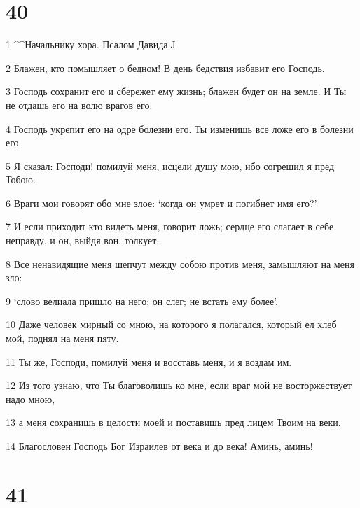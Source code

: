 \chapter{40}

\par 1 ^^Начальнику хора. Псалом Давида.^^
\par 2 Блажен, кто помышляет о бедном! В день бедствия избавит его Господь.
\par 3 Господь сохранит его и сбережет ему жизнь; блажен будет он на земле. И Ты не отдашь его на волю врагов его.
\par 4 Господь укрепит его на одре болезни его. Ты изменишь все ложе его в болезни его.
\par 5 Я сказал: Господи! помилуй меня, исцели душу мою, ибо согрешил я пред Тобою.
\par 6 Враги мои говорят обо мне злое: `когда он умрет и погибнет имя его?'
\par 7 И если приходит кто видеть меня, говорит ложь; сердце его слагает в себе неправду, и он, выйдя вон, толкует.
\par 8 Все ненавидящие меня шепчут между собою против меня, замышляют на меня зло:
\par 9 `слово велиала пришло на него; он слег; не встать ему более'.
\par 10 Даже человек мирный со мною, на которого я полагался, который ел хлеб мой, поднял на меня пяту.
\par 11 Ты же, Господи, помилуй меня и восставь меня, и я воздам им.
\par 12 Из того узнаю, что Ты благоволишь ко мне, если враг мой не восторжествует надо мною,
\par 13 а меня сохранишь в целости моей и поставишь пред лицем Твоим на веки.
\par 14 Благословен Господь Бог Израилев от века и до века! Аминь, аминь!

\chapter{41}

